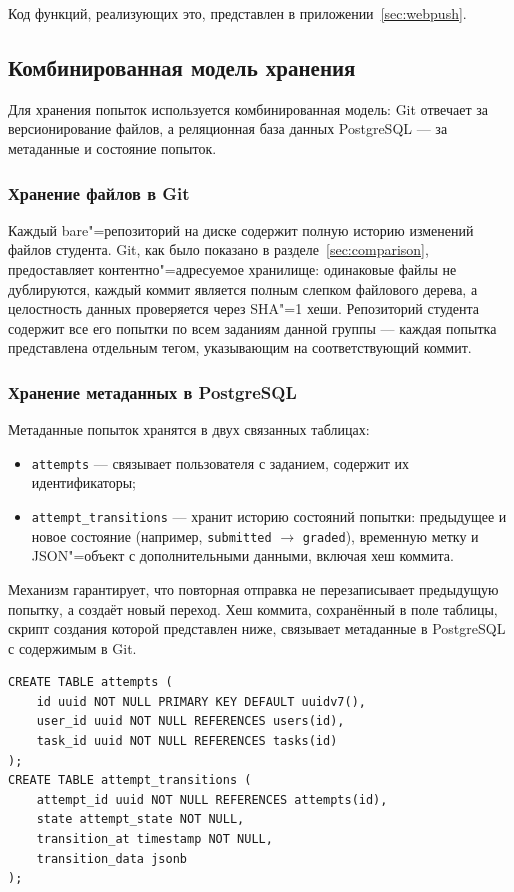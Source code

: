 \documentclass[coursework]{SCWorks}
\begin{document}
Код функций, реализующих это, представлен в приложении~\ref{sec:webpush}.

\subsection{Комбинированная модель хранения}

Для хранения попыток используется комбинированная модель: Git отвечает за версионирование файлов, а реляционная база данных PostgreSQL --- за метаданные и состояние попыток.

\subsubsection{Хранение файлов в Git}

Каждый bare"=репозиторий на диске содержит полную историю изменений файлов студента. Git, как было показано в разделе~\ref{sec:comparison}, предоставляет контентно"=адресуемое хранилище: одинаковые файлы не дублируются, каждый коммит является полным слепком файлового дерева, а целостность данных проверяется через SHA"=1 хеши. Репозиторий студента содержит все его попытки по всем заданиям данной группы --- каждая попытка представлена отдельным тегом, указывающим на соответствующий коммит.

\subsubsection{Хранение метаданных в PostgreSQL}

Метаданные попыток хранятся в двух связанных таблицах:

\begin{itemize}
	\item \texttt{attempts} --- связывает пользователя с заданием, содержит их идентификаторы;
	\item \texttt{attempt\_transitions} --- хранит историю состояний попытки: предыдущее и новое состояние (например, \texttt{submitted} $\to$ \texttt{graded}), временную метку и JSON"=объект с дополнительными данными, включая хеш коммита.
\end{itemize}

Механизм гарантирует, что повторная отправка не перезаписывает предыдущую попытку, а создаёт новый переход. Хеш коммита, сохранённый в поле  таблицы, скрипт создания которой представлен ниже, связывает метаданные в PostgreSQL с содержимым в Git.

\begin{verbatim}
CREATE TABLE attempts (
    id uuid NOT NULL PRIMARY KEY DEFAULT uuidv7(),
    user_id uuid NOT NULL REFERENCES users(id),
    task_id uuid NOT NULL REFERENCES tasks(id)
);
CREATE TABLE attempt_transitions (
    attempt_id uuid NOT NULL REFERENCES attempts(id),
    state attempt_state NOT NULL,
    transition_at timestamp NOT NULL,
    transition_data jsonb
);
\end{verbatim}
\end{document}
